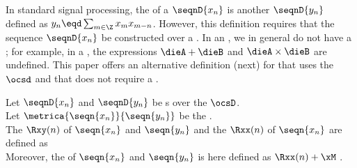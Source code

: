 In standard signal processing, the  of a  $\seqnD{x_n}$ 
is another  $\seqnD{y_n}$ defined as 
$y_n\eqd\sum_{m\in\Z}x_m x_{m-n}$.
However, this definition requires that the sequence $\seqnD{x_n}$ be constructed over a .
In an , we in general do not have a ;
for example, in a , the expressions $\dieA+\dieB$ and $\dieA\times\dieB$ are undefined.
This paper offers an alternative definition (next) for  that uses the  $\ocsd$ 
and that does not require a . 
\begin{definition}
\label{def:ocsRxx}
Let $\seqnD{x_n}$ and $\seqnD{y_n}$ be s 
over the  $\ocsD$.
\\Let $\metrica{\seqn{x_n}}{\seqn{y_n}}$ be the  .
\\The {} $\Rxy(n)$ of $\seqn{x_n}$ and $\seqn{y_n}$ and 
the   $\Rxx(n)$ of $\seqn{x_n}$ 
are defined as
\\
Moreover, the  of $\seqn{x_n}$ and $\seqn{y_n}$ is here defined 
as $\Rxx(n)+\xM$ .
\end{definition}

